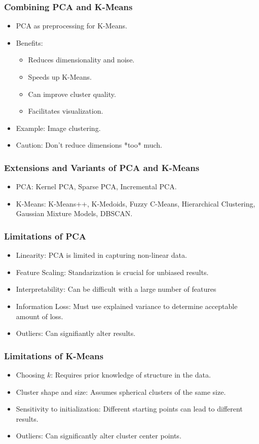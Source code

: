 \documentclass[aspectratio=169]{beamer}
\begin{document}
\begin{frame}
\frametitle{Combining PCA and K-Means}
\begin{itemize}
    \item PCA as preprocessing for K-Means.
    \item Benefits:
    \begin{itemize}
        \item Reduces dimensionality and noise.
        \item Speeds up K-Means.
        \item Can improve cluster quality.
        \item Facilitates visualization.
    \end{itemize}
    \item Example: Image clustering.
    \item Caution: Don't reduce dimensions *too* much.
\end{itemize}
\end{frame}

\begin{frame}
\frametitle{Extensions and Variants of PCA and K-Means}
\begin{itemize}
    \item PCA: Kernel PCA, Sparse PCA, Incremental PCA.
    \item K-Means: K-Means++, K-Medoids, Fuzzy C-Means, Hierarchical Clustering, Gaussian Mixture Models, DBSCAN.
\end{itemize}
\end{frame}

\begin{frame}
\frametitle{Limitations of PCA}
\begin{itemize}
\item  Linearity: PCA is limited in capturing non-linear data.
\item Feature Scaling: Standarization is crucial for unbiased results.
\item Interpretability: Can be difficult with a large number of features
\item Information Loss: Must use explained variance to determine acceptable amount of loss.
\item Outliers: Can signifiantly alter results.
\end{itemize}
\end{frame}

\begin{frame}
\frametitle{Limitations of K-Means}
\begin{itemize}
\item Choosing $k$: Requires prior knowledge of structure in the data.
\item Cluster shape and size: Assumes spherical clusters of the same size.
\item Sensitivity to initialization: Different starting points can lead to different results.
\item Outliers: Can significantly alter cluster center points.
\end{itemize}
\end{frame}
\end{document}
